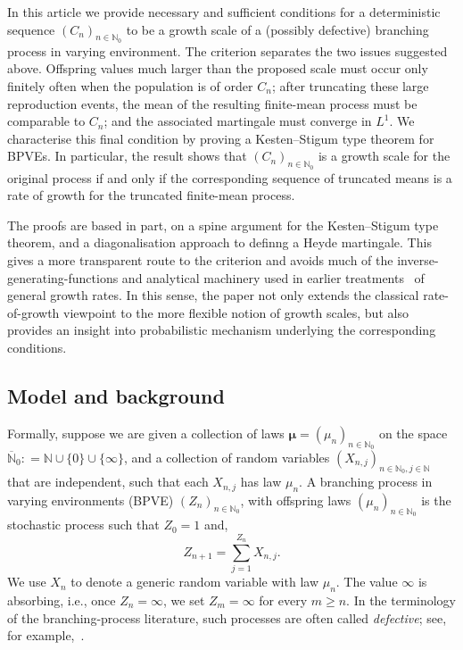 \documentclass[12pt]{article}
\theoremstyle{definition}
\begin{document}
In this article we provide necessary and sufficient conditions for a deterministic sequence $(C_n)_{n\in\mathbb{N}_0}$ to be a growth scale of a (possibly defective) branching process in varying environment. The criterion separates the two issues suggested above. Offspring values much larger than the proposed scale must occur only finitely often when the population is of order $C_n$; after truncating these large reproduction events, the mean of the resulting finite-mean process must be comparable to $C_n$; and the associated martingale must converge in $L^1$. We characterise this final condition by proving a Kesten--Stigum type theorem for BPVEs. In particular, the result shows that $(C_n)_{n\in\mathbb{N}_0}$ is a growth scale for the original process if and only if the corresponding sequence of truncated means is a rate of growth for the truncated finite-mean process. 

The proofs are based in part, on a spine argument for the Kesten--Stigum type theorem, and a diagonalisation approach to definng a Heyde martingale. This gives a more transparent route to the criterion and avoids much of the inverse-generating-functions and analytical machinery used in earlier treatments~\cite{schuh-barbour-infinite-mean, dsouza-rates-of-growth} of general growth rates. In this sense, the paper not only extends the classical rate-of-growth viewpoint to the more flexible notion of growth scales, but also provides an insight into probabilistic mechanism underlying the corresponding conditions.


\subsection{Model and background} 
Formally, suppose we are given a collection of laws $\boldsymbol{\mu} = (\mu_{n})_{n \in \mathbb{N}_0}$ on the space $\overline{\mathbb{N}}_{0} : = \mathbb{N} \cup \{0\} \cup \{\infty\}$, and a collection of random variables $(X_{n, j})_{n \in \mathbb{N}_0, j \in \mathbb{N}}$ that are independent, such that each $X_{n, j}$ has law $\mu_{n}$. A branching process in varying environments (BPVE) $(Z_{n})_{n \in \mathbb{N}_0}$, with offspring laws $(\mu_{n})_{n \in \mathbb{N}_0}$ is the stochastic process such that $Z_{0} = 1$ and, 
\begin{equation} \label{eq:definition-of-process}
    Z_{n+1} = \sum_{j=1}^{Z_{n}} X_{n, j}. 
\end{equation}    
We use $X_n$ to denote a generic random variable with law $\mu_n$. The value $\infty$ is absorbing, i.e., once $Z_n=\infty$, we set $Z_m=\infty$ for every $m\geq n$. In the terminology of the branching-process literature, such processes are often called \emph{defective}; see, for example,~\cite{defective-bgw, defective-bpves}.
\end{document}
